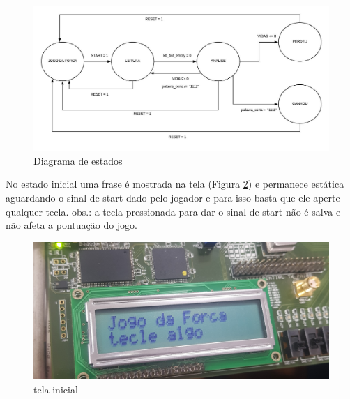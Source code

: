 \documentclass[a4paper,12pt,twoside]{article}
\begin{document}
\begin{figure}[H]
\centering
\includegraphics[scale=0.6]{diagramajogo.jpeg}
\caption{Diagrama de estados}
\label{fig:diagramajogo}
\end{figure}

No estado inicial uma frase é mostrada na tela (Figura \ref{fig:telainicial}) e permanece estática aguardando o sinal de start dado pelo jogador e para isso basta que ele aperte qualquer tecla. 
obs.: a tecla pressionada para dar o sinal de start não é salva e não afeta a pontuação do jogo.

\begin{figure}[H]
\centering
\includegraphics[scale=0.1]{inicio.jpg}
\caption{tela inicial}
\label{fig:telainicial}
\end{figure}
\end{document}
